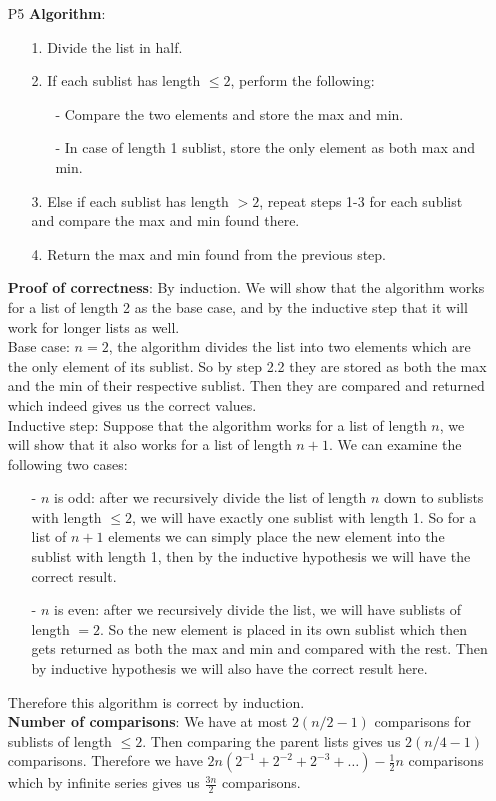 \documentclass{article}
\begin{document}
\newpage
\begin{itemize}
    \item [P5]
          \textbf{Algorithm}:
          \begin{itemize}
              \item [1.] Divide the list in half.
              \item [2.] If each sublist has length $\leq 2$, perform the following:
                    \begin{itemize}
                        \item [-] Compare the two elements and store the max and min.
                        \item [-] In case of length 1 sublist, store the only element as both max and min.
                    \end{itemize}
              \item [3.] Else if each sublist has length $>2$, repeat steps 1-3 for each sublist and compare the max and min found there.
              \item [4.] Return the max and min found from the previous step.
          \end{itemize}
          \textbf{Proof of correctness}: By induction. We will show that the algorithm works for a list of length 2 as the base case, and by the inductive step that it will work for longer lists as well.\\
          Base case: $n=2$, the algorithm divides the list into two elements which are the only element of its sublist. So by step 2.2 they are stored as both the max and the min of their respective sublist. Then they are compared and returned which indeed gives us the correct values.\\
          Inductive step: Suppose that the algorithm works for a list of length $n$, we will show that it also works for a list of length $n+1$. We can examine the following two cases:
          \begin{itemize}
              \item [-] $n$ is odd: after we recursively divide the list of length $n$ down to sublists with length $\leq 2$, we will have exactly one sublist with length 1. So for a list of $n+1$ elements we can simply place the new element into the sublist with length 1, then by the inductive hypothesis we will have the correct result.
              \item [-] $n$ is even: after we recursively divide the list, we will have sublists of length $=2$. So the new element is placed in its own sublist which then gets returned as both the max and min and compared with the rest. Then by inductive hypothesis we will also have the correct result here.
          \end{itemize}
          Therefore this algorithm is correct by induction.\\
          \textbf{Number of comparisons}: We have at most $2(n/2-1)$ comparisons for sublists of length $\leq 2$. Then comparing the parent lists gives us $2(n/4-1)$ comparisons. Therefore we have $2n(2^{-1}+2^{-2}+2^{-3}+\ldots)-\frac{1}{2}n$ comparisons which by infinite series gives us $\frac{3n}{2}$ comparisons.
\end{itemize}
\end{document}
